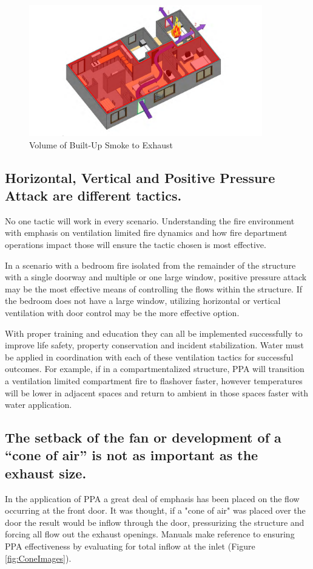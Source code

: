 \documentclass{article}
\begin{document}
\begin{figure}[H]
	\centering
	\includegraphics[width = 4in ]{0_Images/Tactical_Considerations/Understanding_Basics/SmokeToBeExhausted.pdf}
	\caption{Volume of Built-Up Smoke to Exhaust}
	\label{fig:SmokeToExhaust}
\end{figure}

\subsection{Horizontal, Vertical and Positive Pressure Attack are different tactics.} 
No one tactic will work in every scenario. Understanding the fire environment with emphasis on ventilation limited fire dynamics and how fire department operations impact those will ensure the tactic chosen is most effective.

In a scenario with a bedroom fire isolated from the remainder of the structure with a single doorway and multiple or one large window, positive pressure attack may be the most effective means of controlling the flows within the structure. If the bedroom does not have a large window, utilizing horizontal or vertical ventilation with door control may be the more effective option. 

With proper training and education they can all be implemented successfully to improve life safety, property conservation and incident stabilization.  Water must be applied in coordination with each of these ventilation tactics for successful outcomes.   For example, if in a compartmentalized structure, PPA will transition a ventilation limited compartment fire to flashover faster, however temperatures will be lower in adjacent spaces and return to ambient in those spaces faster with water application.

\subsection{The setback of the fan or development of a “cone of air” is not as important as the exhaust size.}
In the application of PPA a great deal of emphasis has been placed on the flow occurring at the front door. It was thought, if a "cone of air" was placed over the door the result would be inflow through the door, pressurizing the structure and forcing all flow out the exhaust openings. Manuals make reference to ensuring PPA effectiveness by evaluating for total inflow at the inlet (Figure \ref{fig:ConeImages}).
\end{document}
